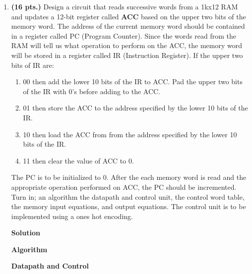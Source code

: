 \begin{enumerate}
    \item  \textbf{ (16 pts.)} Design a circuit that reads successive words from
        a 1kx12 RAM and
        updates a 12-bit register called \textbf{ ACC} based on the upper two bits of the
        memory word.  The address of the current memory word should be contained
        in a register called PC (Program Counter).  Since the words read from the
        RAM will tell us what operation to perform on the ACC, the memory word will
        be stored in a register called IR (Instruction Register).  If the upper
        two bits of IR are:
        \begin{enumerate}
            \item  00 then add the lower 10 bits of the IR to ACC.  Pad the upper two
                bits of the IR with 0's before adding to the ACC.
            \item  01 then store the ACC to the address specified by the
                lower 10 bits of the IR.
            \item  10 then load the ACC from from the address specified by the lower
                10 bits of the IR.
            \item  11 then clear the value of ACC to 0.
        \end{enumerate}

        The PC is to be initialized to 0.  After the each memory word is read
        and the appropriate operation performed on ACC, the PC should be
        incremented.
        Turn in; an algorithm the datapath and control unit, the control word
        table, the memory input equations, and output equations.
        The control unit is to be implemented using a ones hot encoding.

        \begin{onlysolution}  \textbf{Solution} \itshape{

                \textbf{ Algorithm}

                \textbf{ Datapath and Control}

                \begin{figure}[ht]
                \end{figure}

}
\end{onlysolution}
\end{enumerate}
